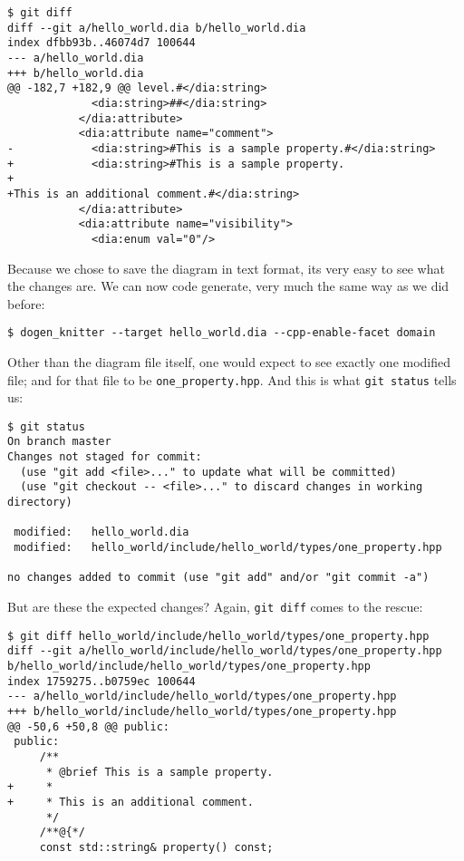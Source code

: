 \documentclass[11pt]{article}
\begin{document}
\begin{verbatim}
$ git diff
diff --git a/hello_world.dia b/hello_world.dia
index dfbb93b..46074d7 100644
--- a/hello_world.dia
+++ b/hello_world.dia
@@ -182,7 +182,9 @@ level.#</dia:string>
             <dia:string>##</dia:string>
           </dia:attribute>
           <dia:attribute name="comment">
-            <dia:string>#This is a sample property.#</dia:string>
+            <dia:string>#This is a sample property.
+
+This is an additional comment.#</dia:string>
           </dia:attribute>
           <dia:attribute name="visibility">
             <dia:enum val="0"/>
\end{verbatim}

Because we chose to save the diagram in text format, its very easy to
see what the changes are. We can now code generate, very much the same
way as we did before:

\begin{verbatim}
$ dogen_knitter --target hello_world.dia --cpp-enable-facet domain
\end{verbatim}

Other than the diagram file itself, one would expect to see exactly
one modified file; and for that file to be \texttt{one\_property.hpp}. And
this is what \texttt{git status} tells us:

\begin{verbatim}
$ git status
On branch master
Changes not staged for commit:
  (use "git add <file>..." to update what will be committed)
  (use "git checkout -- <file>..." to discard changes in working directory)

 modified:   hello_world.dia
 modified:   hello_world/include/hello_world/types/one_property.hpp

no changes added to commit (use "git add" and/or "git commit -a")
\end{verbatim}

But are these the expected changes? Again, \texttt{git diff} comes to the
rescue:

\begin{verbatim}
$ git diff hello_world/include/hello_world/types/one_property.hpp
diff --git a/hello_world/include/hello_world/types/one_property.hpp b/hello_world/include/hello_world/types/one_property.hpp
index 1759275..b0759ec 100644
--- a/hello_world/include/hello_world/types/one_property.hpp
+++ b/hello_world/include/hello_world/types/one_property.hpp
@@ -50,6 +50,8 @@ public:
 public:
     /**
      * @brief This is a sample property.
+     *
+     * This is an additional comment.
      */
     /**@{*/
     const std::string& property() const;
\end{verbatim}
\end{document}
